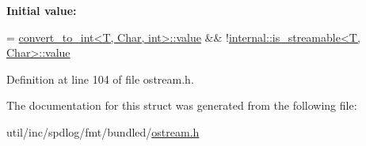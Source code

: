 {\bfseries Initial value\+:}
\begin{DoxyCode}
=
    \hyperlink{structconvert__to__int}{convert\_to\_int<T, Char, int>::value} &&
    !\hyperlink{classinternal_1_1is__streamable}{internal::is\_streamable<T, Char>::value}
\end{DoxyCode}


Definition at line 104 of file ostream.\+h.



The documentation for this struct was generated from the following file\+:\begin{DoxyCompactItemize}
\item 
util/inc/spdlog/fmt/bundled/\hyperlink{ostream_8h}{ostream.\+h}\end{DoxyCompactItemize}
